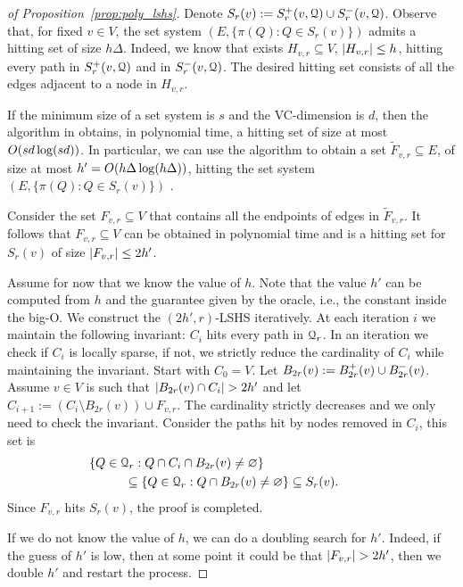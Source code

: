 \begin{proof}[of Proposition~\ref{prop:poly_lshs}]
Denote $S_r(v):=S^+_r(v,\mathcal{Q})\cup S^-_r(v,\mathcal{Q})$. 
Observe that, for fixed $v\in V$, the set system $(E,\{\pi(Q):Q \in S_r(v)\})$ admits a hitting set of size $h\Delta$.
Indeed, we know that exists $H_{v,r}\subseteq V$, $\lvert H_{v,r}\rvert\leq h$, hitting every path in $S^+_r(v,\mathcal{Q})$ and in $S^-_r(v,\mathcal{Q})$.
The desired hitting set consists of all the edges adjacent to a node in $H_{v,r}$.

If the minimum size of a set system is $s$ and the VC-dimension is $d$, then the algorithm in \cite{vc_dim_hitting} obtains, in polynomial time, a hitting set of size at most $O(sd\log(sd))$.
In particular, we can use the algorithm to obtain a set $\tilde F_{v,r}\subseteq E$, of size at most $h'=O(h\Delta\log(h\Delta))$, hitting the set system $(E,\{\pi(Q):Q \in S_r(v)\})$ .

Consider the set $F_{v,r}\subseteq V$ that contains all the endpoints of edges in $\tilde F_{v,r}$.
It follows that $F_{v,r}\subseteq V$ can be obtained in polynomial time and is a hitting set for $S_r(v)$ of size $\lvert F_{v,r}\rvert\leq 2h'$.

Assume for now that we know the value of $h$.
Note that the value $h'$ can be computed from $h$ and the guarantee given by the oracle, i.e., the constant inside the big-O.
We construct the $(2h',r)$-LSHS iteratively.
At each iteration $i$ we maintain the following invariant: $C_i$ hits every path in $\mathcal{Q}_r$.
In an iteration we check if $C_i$ is locally sparse, if not, we strictly reduce the cardinality of $C_i$ while maintaining the invariant.
Start with $C_0=V$. 
Let $B_{2r}(v):=B^+_{2r}(v)\cup B^-_{2r}(v)$.
Assume $v\in V$ is such that $\lvert B_{2r}(v)\cap C_i\rvert>2h'$ and let $C_{i+1}:=(C_i\setminus B_{2r}(v))\cup F_{v,r} $.
The cardinality strictly decreases and we only need to check the invariant.
Consider the paths hit by nodes removed in $C_i$, this set is
\begin{align*}
&\hspace{-1cm}\{Q\in\calQ_r: Q\cap C_i\cap B_{2r}(v)\neq \varnothing\}\\
&\subseteq \{Q\in\calQ_r: Q\cap B_{2r}(v)\neq \varnothing\} \subseteq S_r(v).
\end{align*}
Since $F_{v,r}$ hits $S_r(v)$, the proof is completed.

If we do not know the value of $h$, we can do a doubling search for $h'$. 
Indeed, if the guess of $h'$ is low, then at some point it could be that $\lvert F_{v,r}\rvert>2h'$, then we double $h'$ and restart the process.
\end{proof}
